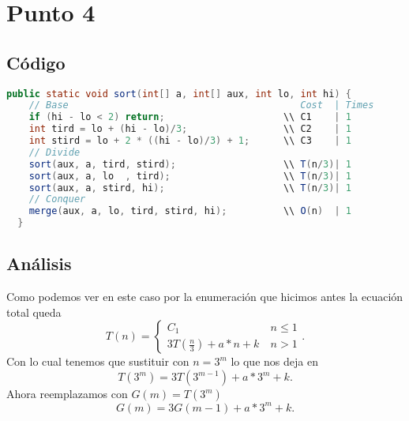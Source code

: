 \documentclass[12pt]{exam}
\begin{document}
\section*{Punto 4}

\subsection*{Código}
\begin{lstlisting}[language=java]
  public static void sort(int[] a, int[] aux, int lo, int hi) {
    // Base                                         Cost  | Times
    if (hi - lo < 2) return;                     \\ C1    | 1
    int tird = lo + (hi - lo)/3;                 \\ C2    | 1
    int stird = lo + 2 * ((hi - lo)/3) + 1;      \\ C3    | 1
    // Divide
    sort(aux, a, tird, stird);                   \\ T(n/3)| 1
    sort(aux, a, lo  , tird);                    \\ T(n/3)| 1
    sort(aux, a, stird, hi);                     \\ T(n/3)| 1
    // Conquer
    merge(aux, a, lo, tird, stird, hi);          \\ O(n)  | 1
  }
\end{lstlisting}

\subsection*{Análisis}
Como podemos ver en este caso por la enumeración que hicimos antes la ecuación total queda \[
T\left( n \right) = \begin{cases}
  C_1 &\ n \le 1 \\
  3T\left( \frac{n}{3} \right) + a*n + k&\ n > 1
\end{cases}
.\] Con lo cual tenemos que sustituir con $n = 3^{m}$ lo que nos deja en \[
T\left( 3^{m} \right) = 3 T\left( 3^{m - 1} \right) + a * 3^{m} + k
.\] Ahora reemplazamos con $G\left( m \right) = T\left( 3^{m} \right) $ \[
G\left( m \right) = 3 G\left( m - 1 \right) + a * 3^{m} + k
.\]
\end{document}
